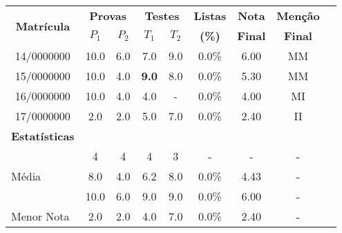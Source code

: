 \begin{longtable}{ccccccccc}
\toprule
\multirow{2}{*}{\textbf{Matrícula}} & \multicolumn{2}{c}{\textbf{Provas}} & \multicolumn{2}{c}{\textbf{Testes}} & \textbf{Listas} & \textbf{Nota} & \textbf{Menção} \\
 & \textbf{$P_{1}$} & \textbf{$P_{2}$} & \textbf{$T_{1}$} & \textbf{$T_{2}$} & \textbf{(\%)} & \textbf{Final} & \textbf{Final} \\
\toprule
\rowcolor[gray]{.9}
14/0000000 & 10.0 & 6.0 & 7.0 & 9.0 & 0.0\% & 6.00 & MM \\
15/0000000 & 10.0 & 4.0 & \textbf{9.0} & 8.0 & 0.0\% & 5.30 & MM \\
\rowcolor[gray]{.9}
16/0000000 & 10.0 & 4.0 & 4.0 & - & 0.0\% & 4.00 & MI \\
17/0000000 & 2.0 & 2.0 & 5.0 & 7.0 & 0.0\% & 2.40 & II \\
\toprule
\textbf{Estatísticas} & \multicolumn{8}{c}{} \\
\toprule
\rowcolor[gray]{.9}
\multicolumn{1}{l}{Presentes} & 4 & 4 & 4 & 3 & - & - & - \\
\multicolumn{1}{l}{Média} & 8.0 & 4.0 & 6.2 & 8.0 & 0.0\% & 4.43 & - \\
\rowcolor[gray]{.9}
\multicolumn{1}{l}{Maior Nota} & 10.0 & 6.0 & 9.0 & 9.0 & 0.0\% & 6.00 & - \\
\multicolumn{1}{l}{Menor Nota} & 2.0 & 2.0 & 4.0 & 7.0 & 0.0\% & 2.40 & - \\
\bottomrule
\end{longtable}

\let\thefootnote\relax{}
